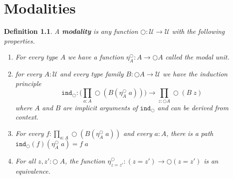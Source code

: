\documentclass[12pt]{report}
\newtheorem{defn}[thm]{Definition}
\theoremstyle{definition}
\begin{document}
\chapter{Modalities}
\begin{defn}\label{modality_definition}
A \textbf{modality} is any function $\bigcirc : \mathcal{U} \rightarrow \mathcal{U}$ with the following properties.
\begin{enumerate}
	\item For every type $A$ we have a function $\eta_A^\bigcirc : A \rightarrow \bigcirc A$ called the modal unit.
	\item for every $A : \mathcal{U}$ and every type family $B : \bigcirc A \rightarrow \mathcal{U}$ we have the induction principle
	$$\mathtt{ind}_\bigcirc : \Big( \prod_{a : A}\bigcirc (B (\eta_A^\bigcirc\; a)) \Big) \rightarrow \prod_{z : \bigcirc A} \bigcirc (B\; z)$$
	where $A$ and $B$ are implicit arguments of $\mathtt{ind}_\bigcirc$ and can be derived from context. 
	\item For every $f : \prod_{a : A} \bigcirc (B(\eta_A^\bigcirc\; a))$ and every $a : A$, there is a path $\mathtt{ind}_\bigcirc (f)(\eta_A^\bigcirc\; a) = f\; a$
	\item For all $z,z' : \bigcirc \; A$, the function $\eta_{z=z'}^\bigcirc : (z = z') \rightarrow \bigcirc (z = z')$ is an equivalence.
\end{enumerate}
\end{defn}
\end{document}
